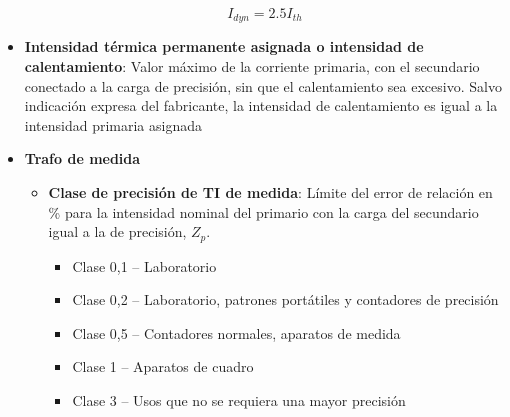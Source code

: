\begin{itemize}
	\begin{equation}
		I_{dyn}=2.5I_{th}
	\end{equation}
	\item \textbf{Intensidad térmica permanente asignada o intensidad de calentamiento}: Valor máximo de la corriente primaria, con el secundario conectado a la carga de precisión, sin que el calentamiento sea excesivo. 	Salvo indicación expresa del fabricante, la intensidad de calentamiento es igual a la intensidad primaria asignada
	\item \textbf{Trafo de medida}
	\begin{itemize}
		\item \textbf{Clase de precisión de TI de medida}: Límite del error de relación en \% para la intensidad nominal del primario con la carga del secundario igual a la de precisión, $Z_p$.
		\begin{itemize}
			\item Clase 0,1 – Laboratorio
			\item Clase 0,2 – Laboratorio, patrones portátiles y contadores de precisión
			\item Clase 0,5 – Contadores normales, aparatos de medida
			\item Clase 1 – Aparatos de cuadro
			\item Clase 3 – Usos que no se requiera una mayor precisión
			 

\end{itemize}
\end{itemize}
\end{itemize}

